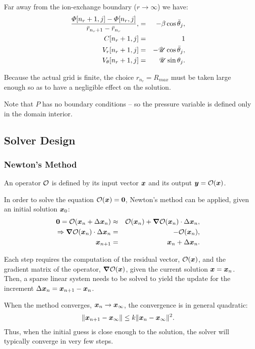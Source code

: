 Far away from the ion-exchange boundary ($r\rightarrow\infty$) we have:
\begin{eqnarray}
\frac{\varPhi[n_r + 1, j] - \varPhi[n_r, j]}{\bar{r}_{n_r + 1} - \bar{r}_{n_r}}, 
 & = & -\beta \cos\bar{\theta}_j, \\
C[n_r + 1, j] & = & 1 \\
V_r[n_r + 1, j] & = & -\mathscr{U} \cos\bar{\theta}_j, \\
V_\theta[n_r + 1, j] & = & \mathscr{U} \sin\theta_j.
\end{eqnarray}

Because the actual grid is finite, the choice 
$r_{n_r} = R_{max}$ must be taken large enough so as to have a negligible effect
on the solution.

Note that $P$ has no boundary conditions -- so the pressure variable is defined 
only in the domain interior.

\subsection{Solver Design}
\subsubsection{Newton's Method}
An operator $\mathcal{O}$ is defined by its input vector $\boldsymbol{x}$ and its output 
$\boldsymbol{y} = \mathcal{O}(\boldsymbol{x})$.

In order to solve the equation $\mathcal{O}(\boldsymbol{x}) = \boldsymbol{0}$, Newton's method can 
be applied, given an initial solution $\boldsymbol{x}_0$:
\begin{eqnarray}
\boldsymbol{0} = \mathcal{O}(\boldsymbol{x}_n + \Delta \boldsymbol{x}_n) &\approx& \mathcal{O}(\boldsymbol{x}_n) + \boldsymbol{\nabla} \mathcal{O}(\boldsymbol{x}_n)\cdot\Delta\boldsymbol{x}_n, \\
\Rightarrow \boldsymbol{\nabla} \mathcal{O}(\boldsymbol{x}_n) \cdot \Delta \boldsymbol{x}_n &=& -\mathcal{O}(\boldsymbol{x}_n), \\
\boldsymbol{x}_{n+1} &=& \boldsymbol{x}_{n} + \Delta \boldsymbol{x}_n. 
\end{eqnarray}

Each step requires the computation of the residual vector, $\mathcal{O}(\boldsymbol{x})$, and
the gradient matrix of the operator, $\boldsymbol{\nabla} \mathcal{O}(\boldsymbol{x})$, 
given the current solution $\boldsymbol{x} = \boldsymbol{x}_n$.
Then, a sparse linear system needs to be solved to yield the update for the 
increment $\Delta \boldsymbol{x}_n = \boldsymbol{x}_{n+1} - \boldsymbol{x}_n$.

When the method converges, $\boldsymbol{x}_n \rightarrow \boldsymbol{x}_\infty$, 
the convergence is in general quadratic:
\begin{eqnarray}
\|\boldsymbol{x}_{n+1} - \boldsymbol{x}_\infty\| \le k \|\boldsymbol{x}_{n} - \boldsymbol{x}_\infty\|^2.
\end{eqnarray}
Thus, when the initial guess is close enough to the solution, the solver
will typically converge in very few steps.

